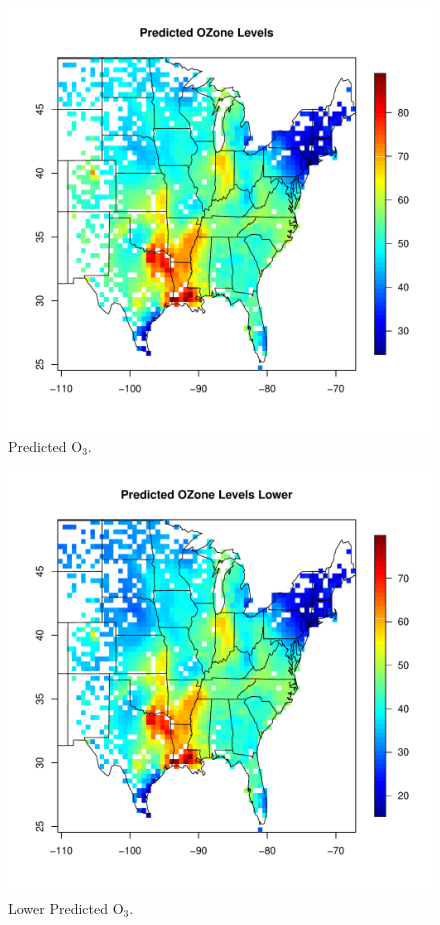 \documentclass{article}                                                   %
\def\beginmyfig{\begin{figure}[htbp]\begin{center}}                       %
\def\endmyfig{\end{center}\end{figure}}                                   %
\begin{document}
    \beginmyfig
      \includegraphics{raw/center.pdf}
      \caption{Predicted O$_3$.}
    \endmyfig

    \beginmyfig
      \includegraphics{raw/lower.pdf}
      \caption{Lower Predicted O$_3$.}
    \endmyfig
\end{document}

